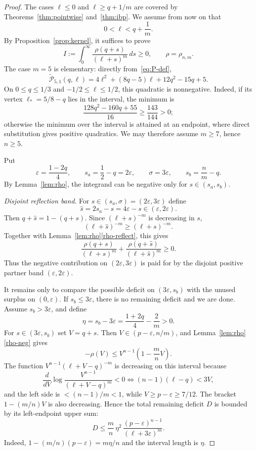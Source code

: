 \documentclass[11pt]{article}
\newcommand{\wtP}{\widetilde{\mathcal P}}
\begin{document}
\begin{proof}
The cases $\ell\le0$ and $\ell\ge q+1/m$ are covered by Theorems~\ref{thm:pointwise} and~\ref{thm:ibp}.  We assume from now on that
\[
        0<\ell<q+\frac1m.
\]
By Proposition~\ref{prop:kernel}, it suffices to prove
\[
        I:=\int_0^\infty \frac{\rho(q+s)}{(\ell+s)^m}\,ds\ge0,
        \qquad \rho=\rho_{n,m}.
\]
The case $m=5$ is elementary: directly from~\eqref{eq:P-def},
\[
        \wtP_{5,1}(q,\ell)=4\ell^2+(8q-5)\ell+12q^2-15q+5.
\]
On $0\le q\le1/3$ and $-1/2\le\ell\le1/2$, this quadratic is nonnegative.  Indeed, if its vertex $\ell_*=5/8-q$ lies in the interval, the minimum is
\[
        \frac{128q^2-160q+55}{16}\ge \frac{143}{144}>0;
\]
otherwise the minimum over the interval is attained at an endpoint, where direct substitution gives positive quadratics.  We may therefore assume $m\ge7$, hence $n\ge5$.

Put
\[
        \varepsilon=\frac{1-2q}{4},
        \qquad s_a=\frac12-q=2\varepsilon,
        \qquad \sigma=3\varepsilon,
        \qquad s_b=\frac nm-q.
\]
By Lemma~\ref{lem:rho}, the integrand can be negative only for $s\in(s_a,s_b)$.

\emph{Disjoint reflection band.}  For $s\in(s_a,\sigma)=(2\varepsilon,3\varepsilon)$ define
\[
        \widehat s=2s_a-s=4\varepsilon-s\in(\varepsilon,2\varepsilon).
\]
Then $q+\widehat s=1-(q+s)$.  Since $(\ell+s)^{-m}$ is decreasing in $s$,
\[
        (\ell+\widehat s)^{-m}\ge(\ell+s)^{-m}.
\]
Together with Lemma~\ref{lem:rho}\ref{rho-reflect}, this gives
\[
        \frac{\rho(q+s)}{(\ell+s)^m}
        +\frac{\rho(q+\widehat s)}{(\ell+\widehat s)^m}
        \ge0.
\]
Thus the negative contribution on $(2\varepsilon,3\varepsilon)$ is paid for by the disjoint positive partner band $(\varepsilon,2\varepsilon)$.

It remains only to compare the possible deficit on $(3\varepsilon,s_b)$ with the unused surplus on $(0,\varepsilon)$.  If $s_b\le3\varepsilon$, there is no remaining deficit and we are done.  Assume $s_b>3\varepsilon$, and define
\[
        \eta=s_b-3\varepsilon=\frac{1+2q}{4}-\frac2m>0.
\]
For $s\in(3\varepsilon,s_b)$ set $V=q+s$.  Then $V\in(p-\varepsilon,n/m)$, and Lemma~\ref{lem:rho}\ref{rho-neg} gives
\[
        -\rho(V)\le V^{n-1}\left(1-\frac mnV\right).
\]
The function $V^{n-1}(\ell+V-q)^{-m}$ is decreasing on this interval because
\[
        \frac{d}{dV}\log\frac{V^{n-1}}{(\ell+V-q)^m}<0
        \iff (n-1)(\ell-q)<3V,
\]
and the left side is $<(n-1)/m<1$, while $V\ge p-\varepsilon\ge7/12$.  The bracket $1-(m/n)V$ is also decreasing.  Hence the total remaining deficit $D$ is bounded by its left-endpoint upper sum:
\begin{equation}\label{eq:D-new}
        D\le \frac mn\,\eta^2\,\frac{(p-\varepsilon)^{n-1}}{(\ell+3\varepsilon)^m}.
\end{equation}
Indeed, $1-(m/n)(p-\varepsilon)=m\eta/n$ and the interval length is $\eta$.


\end{proof}
\end{document}
